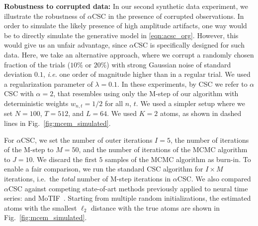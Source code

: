 \textbf{Robustness to corrupted data:} 
In our second synthetic data experiment, we illustrate the robustness of $\alpha$CSC in the presence of corrupted observations.
%
In order to simulate the likely presence of high amplitude artifacts, one way would be to directly simulate the generative model in \eqref{eqn:acsc_org}. However, this would give us an unfair advantage, since $\alpha$CSC is specifically designed for such data. Here, we take an alternative approach, where we corrupt a randomly chosen fraction of the trials ($10\%$ or $20\%$) with strong Gaussian noise of standard deviation $0.1$, \textit{i.e.} one order of magnitude higher than in a regular trial. We used a regularization parameter of $\lambda = 0.1$.
%
In these experiments, by CSC we refer to $\alpha$CSC with $\alpha=2$, that resembles using only the M-step of our algorithm with deterministic weights $w_{n,t}=1/2$ for all $n$, $t$. We used a simpler setup where we set $N=100$, $T=512$, and $L=64$. We used $K=2$ atoms, as shown in dashed lines in Fig.~\ref{fig:mcem_simulated}.

%

%
For $\alpha$CSC, we set the number of outer iterations $I=5$, the number of iterations of the M-step to $M=50$, and the number of iterations of the MCMC algorithm to $J=10$. We discard the first $5$ samples of the MCMC algorithm as burn-in.
%
%
To enable a fair comparison, we run the standard CSC algorithm for $I\times M$ iterations, i.e.\ the \emph{total} number of M-step iterations in $\alpha$CSC. We also compared $\alpha$CSC against competing state-of-art methods previously applied to neural time series: \citet{brockmeier2016learning} and MoTIF~\citep{jost2006motif}. 
%
Starting from multiple random initializations, the estimated atoms with the smallest $\ell_2$ distance with the true atoms are shown in Fig.~\ref{fig:mcem_simulated}.


